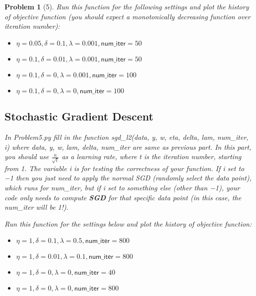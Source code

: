\documentclass[11pt]{article}
\theoremstyle{quest}
\newtheorem*{problem}{Problem}
\begin{document}
\begin{problem}[5]
Run this function for the following settings and plot the history of objective function (you should expect a monotonically decreasing function over iteration number):

\begin{itemize}
    \item $\eta = 0.05, \delta = 0.1, \lambda = 0.001, \textsf{num\_iter}=50$
    \item $\eta = 0.1, \delta = 0.01, \lambda = 0.001, \textsf{num\_iter}=50$
    \item $\eta = 0.1, \delta = 0, \lambda = 0.001, \textsf{num\_iter}=100$
    \item $\eta = 0.1, \delta = 0, \lambda = 0, \textsf{num\_iter}=100$
\end{itemize}

\subsection*{Stochastic Gradient Descent}
In \textsf{Problem5.py} fill in the function \textsf{sgd\_l2(data, y, w, eta, delta, lam, num\_iter, i)} where \textsf{data, y, w, lam, delta, num\_iter} are same as previous part. In this part, you should use $\frac{n}{\sqrt{t}}$ as a learning rate, where \textsf{t} is the iteration number, starting from 1. The variable \textsf{i} is for testing the correctness of your function. If \textsf{i} set to −1 then you just need to apply the normal SGD (randomly select the data point), which runs for \textsf{num\_iter}, but if \textsf{i} set to something else (other than −1), your code only needs to compute \textbf{SGD} for that specific data point (in this case, the \textsf{num\_iter} will be 1!).

Run this function for the settings below and plot the history of objective function:

\begin{itemize}
    \item $\eta = 1, \delta = 0.1, \lambda = 0.5, \textsf{num\_iter}=800$
    \item $\eta = 1, \delta = 0.01, \lambda = 0.1, \textsf{num\_iter}=800$
    \item $\eta = 1, \delta = 0, \lambda = 0, \textsf{num\_iter}=40$
    \item $\eta = 1, \delta = 0, \lambda = 0, \textsf{num\_iter}=800$
\end{itemize}


\end{problem}
\end{document}
